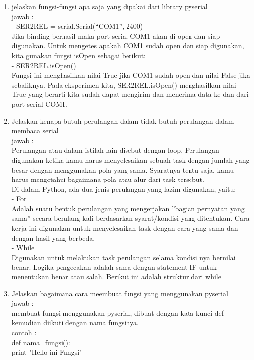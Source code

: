 \begin{itemize}
\begin{enumerate}
\item jelaskan fungsi-fungsi apa saja yang dipakai dari library pyserial\\
jawab :\\
- SER2REL = serial.Serial(“COM1”, 2400)\\

Jika binding berhasil maka port serial COM1 akan di-open dan siap digunakan. Untuk mengetes apakah COM1 sudah open dan siap digunakan, kita gunakan fungsi isOpen sebagai berikut:\\

- SER2REL.isOpen()\\

Fungsi ini menghasilkan nilai True jika COM1 sudah open dan nilai False jika sebaliknya. Pada eksperimen kita, SER2REL.isOpen() menghasilkan nilai True yang berarti kita sudah dapat mengirim dan menerima data ke dan dari port serial COM1.\\

\item Jelaskan kenapa butuh perulangan dalam tidak butuh perulangan dalam membaca serial\\
jawab :\\
Perulangan atau dalam istilah lain disebut dengan loop. Perulangan digunakan ketika kamu harus menyelesaikan sebuah task dengan jumlah yang besar dengan menggunakan pola yang sama. Syaratnya tentu saja, kamu harus mengetahui bagaimana pola atau alur dari task tersebut. \\

Di dalam Python, ada dua jenis perulangan yang lazim digunakan, yaitu:\\

- For\\
Adalah suatu bentuk perulangan yang mengerjakan ”bagian pernyatan yang sama” secara berulang kali berdasarkan syarat/kondisi yang ditentukan. Cara kerja ini digunakan untuk menyelesaikan task dengan cara yang sama dan dengan hasil yang berbeda.\\

- While\\
Digunakan  untuk melakukan task perulangan selama kondisi nya bernilai benar. Logika pengecakan adalah sama dengan statement IF untuk menentukan benar atau salah. Berikut ini adalah struktur dari while\\

\item Jelaskan bagaimana cara meembuat fungsi yang menggunakan pyserial\\
jawab :\\
membuat fungsi menggunakan pyserial, dibuat dengan kata kunci def kemudian diikuti dengan nama fungsinya.\\
contoh :\\
def nama\_fungsi():\\
	print "Hello ini Fungsi"\\


\end{enumerate}
\end{itemize}
